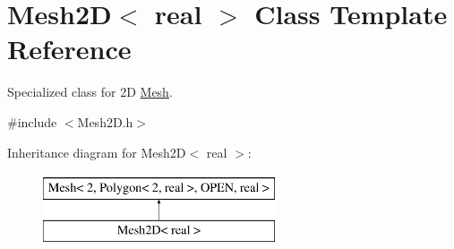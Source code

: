 \hypertarget{class_mesh2_d}{}\section{Mesh2D$<$ real $>$ Class Template Reference}
\label{class_mesh2_d}


Specialized class for 2D \hyperlink{class_mesh}{Mesh}.  




{\ttfamily \#include $<$Mesh2\+D.\+h$>$}

Inheritance diagram for Mesh2D$<$ real $>$\+:\begin{figure}[H]
\begin{center}
\leavevmode
\includegraphics[height=2.000000cm]{class_mesh2_d}
\end{center}
\end{figure}

